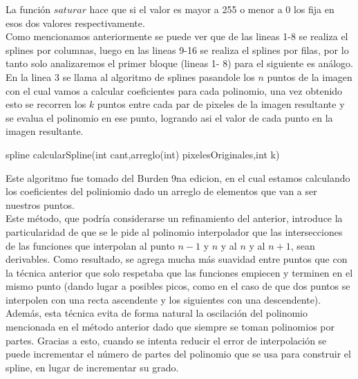 La función $saturar$ hace que si el valor es mayor a 255 o menor a 0 los fija en esos dos valores respectivamente.\\
Como mencionamos anteriormente se puede ver que de las lineas 1-8 se realiza el splines por columnas, luego en las lineas 9-16 se realiza el splines por filas, por lo tanto solo analizaremos el primer bloque (lineas 1- 8) para el siguiente es análogo.\\
En la linea 3 se llama al algoritmo de splines pasandole los $n$ puntos de la imagen con el cual vamos a calcular coeficientes para cada polinomio, una vez obtenido esto se recorren los $k$ puntos entre cada par de pixeles de la imagen resultante y se evalua el polinomio en ese punto, logrando asi el valor de cada punto en la imagen resultante. 
\begin{algorithm}
\begin{algorithmic}[1]\parskip=1mm
\caption{spline calcularSpline(int cant,arreglo(int) pixelesOriginales,int k)}
  \STATE{\quad$ (cs_{i} + 1] - cs[i]) / (3 * k)$}
\end{algorithmic}
\end{algorithm}

Este algoritmo fue tomado del Burden 9na edicion, en el cual estamos calculando los coeficientes del poliniomio dado un arreglo de elementos que van a ser nuestros puntos.\\

Este método, que podría considerarse un refinamiento del anterior, introduce la particularidad de que se le pide al polinomio interpolador que las intersecciones de las funciones que interpolan al punto $n-1$ y $n$ y al $n$ y al $n+1$, sean derivables. Como resultado, se agrega mucha más suavidad entre puntos que con la técnica anterior que solo respetaba que las funciones empiecen y terminen en el mismo punto (dando lugar a posibles picos, como en el caso de que dos puntos se interpolen con una recta ascendente y los siguientes con una descendente). Además, esta técnica evita de forma natural la oscilación del polinomio mencionada en el método anterior dado que siempre se toman polinomios por partes. Gracias a esto, cuando se intenta reducir el error de interpolación se puede incrementar el número de partes del polinomio que se usa para construir el spline, en lugar de incrementar su grado.
